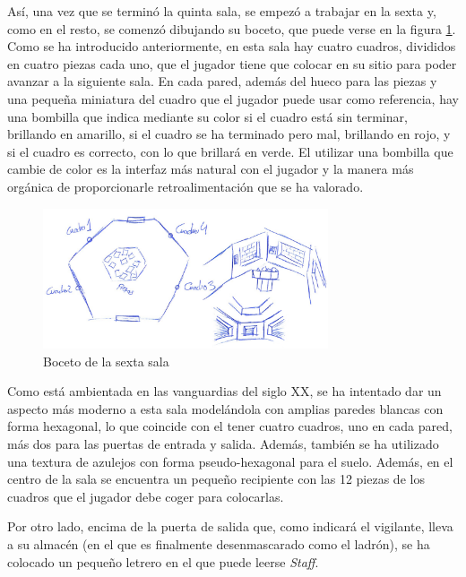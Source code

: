 Así, una vez que se terminó la quinta sala, se empezó a trabajar en la sexta y, como en el resto, se comenzó dibujando su boceto, que puede verse en la figura \ref{fig:boceto-sala-6}. Como se ha introducido anteriormente, en esta sala hay cuatro cuadros, divididos en cuatro piezas cada uno, que el jugador tiene que colocar en su sitio para poder avanzar a la siguiente sala. En cada pared, además del hueco para las piezas y una pequeña miniatura del cuadro que el jugador puede usar como referencia, hay una bombilla que indica mediante su color si el cuadro está sin terminar, brillando en amarillo, si el cuadro se ha terminado pero mal, brillando en rojo, y si el cuadro es correcto, con lo que brillará en verde. El utilizar una bombilla que cambie de color es la interfaz más natural con el jugador y la manera más orgánica de proporcionarle retroalimentación que se ha valorado.

\begin{figure}[!h]
\begin{center}
\includegraphics[width=0.75\textwidth]{imagenes/7/bocetos/boceto-sala-6.png}
\caption{Boceto de la sexta sala}
\label{fig:boceto-sala-6}
\end{center}
\end{figure}

Como está ambientada en las vanguardias del siglo XX, se ha intentado dar un aspecto más moderno a esta sala modelándola con amplias paredes blancas con forma hexagonal, lo que coincide con el tener cuatro cuadros, uno en cada pared, más dos para las puertas de entrada y salida. Además, también se ha utilizado una textura de azulejos con forma pseudo-hexagonal para el suelo. Además, en el centro de la sala se encuentra un pequeño recipiente con las 12 piezas de los cuadros que el jugador debe coger para colocarlas.

Por otro lado, encima de la puerta de salida que, como indicará el vigilante, lleva a su almacén (en el que es finalmente desenmascarado como el ladrón), se ha colocado un pequeño letrero en el que puede leerse \textit{Staff}.

